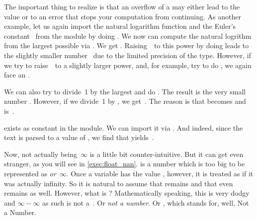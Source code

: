 The important thing to realize is that an overflow of a  may either lead to the  value or to an error that stops your computation from continuing.
As another example, let us again import the natural logarithm function  and the Euler's constant~ from the  module by doing .
We now can compute the natural logrithm from the largest possible  via .
We get .
Raising~\numberE\ to this power by doing  leads to the slightly smaller number~ due to the limited precision of the  type.
However, if we try to raise~\numberE\ to a slightly larger power, and, for example, try to do , we again face an .

We can also try to divide~1 by the largest  and do \pythonIdx{/}.
The result is the very small number .
However, if we divide~1 by , we get~.
The reason is that  becomes  and \pythonIdx{/} is~.

 exists as constant in the  module.
We can import it via .
And indeed, since the text  is parsed to a  value of , we find that  yields~.

%
%

Now,  not actually being~$\infty$ is a little bit counter-intuitive.
But it can get even stranger, as you will see in \cref{exec:float_nan}.
 is a number which is too big to be represented as  \emph{or}~$\infty$.
Once a variable has the value , however, it is treated as if it was actually infinity.
So it is natural to assume that  remains  and that even  remains  as well.
However, what is ?
Mathematically speaking, this is very dodgy and $\infty-\infty$ as such is not a~.
Or \emph{not a number}.
Or , which stands for, well, Not a Number.

